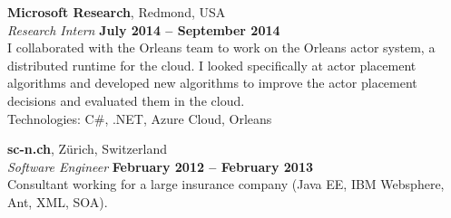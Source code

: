 \documentclass[margin,line]{cv}
\begin{document}
\begin{resume}

    \textbf{Microsoft Research}, Redmond, USA \vspace{2mm}\\\vspace{1mm}%
    \textsl{Research Intern} \hfill \textbf{July 2014 -- September 2014}\\
    I collaborated with the Orleans team to work on the Orleans
    actor system, a distributed runtime for the cloud. I looked specifically at
    actor placement algorithms and developed new algorithms to improve the actor placement
    decisions and evaluated them in the cloud.\\ Technologies: C\#, .NET, Azure Cloud, Orleans


    \textbf{sc-n.ch}, Zürich, Switzerland \vspace{2mm}\\\vspace{1mm}%
    \textsl{Software Engineer} \hfill \textbf{February 2012 -- February 2013}\\
    Consultant working for a large insurance company (Java EE, IBM Websphere, Ant, XML, SOA).




\end{resume}
\end{document}
